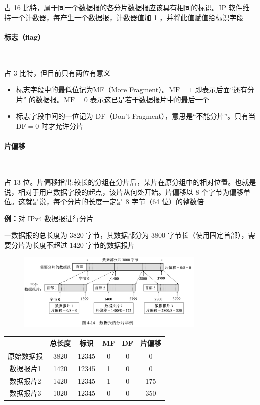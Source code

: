 \documentclass[cs4size,a4paper,10pt]{ctexart}
\begin{document}
	占 16 比特，属于同一个数据报的各分片数据报应该具有相同的标识。IP 软件维持一个计数器，每产生一个数据报，计数器值加 1 ，并将此值赋值给标识字段

	\paragraph{标志（flag）}~{}

	占 3 比特，但目前只有两位有意义
	\begin{itemize}
		\item 标志字段中的最低位记为MF（More Fragment）。$\mathrm{MF}=1$ 即表示后面“还有分片” 的数据报。$\mathrm{MF}=0$ 表示这已是若干数据报片中的最后一个
		\item 标志字段中间的一位记为 DF（Don’t Fragment），意思是“不能分片”。只有当 $\mathrm{DF}=0$ 时才允许分片
	\end{itemize}

	\paragraph{片偏移}~{}

	占 13 位。片偏移指出:较长的分组在分片后，某片在原分组中的相对位置。也就是说，相对于用户数据字段的起点，该片从何处开始。片偏移以 8 个字节为偏移单位。这就是说，每个分片的长度一定是 8 字节（64 位）的整数倍

	\textbf{例：}对 IPv4 数据报进行分片

	一数据报的总长度为 3820 字节，其数据部分为 3800 字节长（使用固定首部），需要分片为长度不超过 1420 字节的数据报片
	\begin{figure}[H]
		\centering
		\includegraphics[width=0.8\textwidth]{img/4.14}
	\end{figure}

	\begin{table}[H]
		\centering
		\begin{tabular}{|c|c|c|c|c|c|}
		\hline
		\textbf{} & 总长度  & 标识    & MF & DF & 片偏移 \\ \hline
		原始数据报     & 3820 & 12345 & 0  & 0  & 0   \\ \hline
		数据报片1     & 1420 & 12345 & 1  & 0  & 0   \\ \hline
		数据报片2     & 1420 & 12345 & 1  & 0  & 175 \\ \hline
		数据报片3     & 1020 & 12345 & 0  & 0  & 350 \\ \hline
		\end{tabular}
	\end{table}
\end{document}
